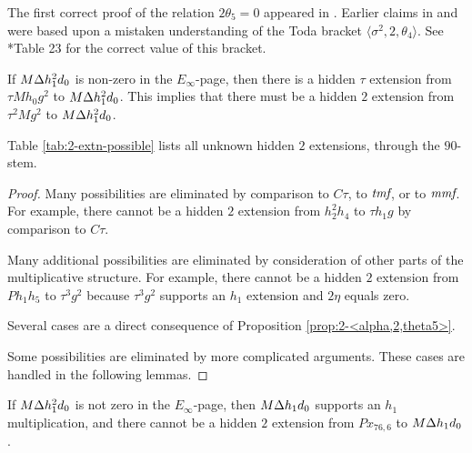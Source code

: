 \begin{remark}
The first correct proof of the relation $2 \theta_5 = 0$ 
appeared in \cite{Xu16}.  Earlier claims in \cite{Lin01}
and \cite{Kochman90} were based upon a mistaken understanding of the
Toda bracket $\langle \sigma^2, 2, \theta_4 \rangle$.
See \cite{Isaksen14c}*{Table 23} for the correct value of
this bracket.
\end{remark}

\begin{remark}
\label{rem:2-tMh0g^2}
If $M \Delta h_1^2 d_0$ is non-zero in the $E_\infty$-page, then
there is a hidden $\tau$ extension from $\tau M h_0 g^2$ to
$M \Delta h_1^2 d_0$.  This implies that there must be a hidden
$2$ extension from $\tau^2 M g^2$ to $M \Delta h_1^2 d_0$.
\end{remark}


\begin{thm}
\label{thm:2-extn-possible}
Table \ref{tab:2-extn-possible} lists all unknown hidden $2$
extensions, through the $90$-stem.
\end{thm}

\begin{proof}
Many possibilities are eliminated by comparison to $C\tau$, to
$\textit{tmf}$, or to $\textit{mmf}$.  For example,
there cannot be a hidden $2$ extension from $h_2^2 h_4$ to $\tau h_1 g$
by comparison to $C\tau$.

Many additional possibilities are eliminated by consideration of other
parts of the multiplicative structure.  For example,
there cannot be a hidden $2$ extension from $P h_1 h_5$
to $\tau^3 g^2$ because $\tau^3 g^2$ supports an $h_1$ extension
and $2 \eta$ equals zero.

Several cases are a direct consequence of Proposition
\ref{prop:2-<alpha,2,theta5>}.

Some possibilities are eliminated by more complicated arguments.
These cases are handled in the following lemmas.
\end{proof}



\begin{remark}
\label{rem:2-Px76,6}
If $M \Delta h_1^2 d_0$ is not zero in the $E_\infty$-page, then
$M \Delta h_1 d_0$ supports an $h_1$ multiplication, and there cannot
be a hidden $2$ extension from $P x_{76,6}$ to $M \Delta h_1 d_0$.
\end{remark}

